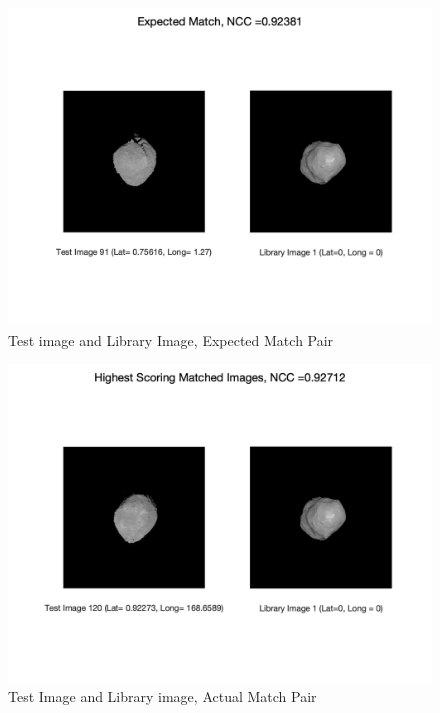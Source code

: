 \begin{figure}[H]
\centering
    \includegraphics[height=0.43\textheight]{fig/expected_match.png}
    \caption{Test image and Library Image, Expected Match Pair}
    \label{fig:expected}
\end{figure}
\begin{figure}[h!]
    \centering
    \includegraphics[height=0.43\textheight]{fig/highest_score.png}
    \caption{Test Image and Library image, Actual Match Pair}
    \label{fig:highest}
\end{figure}

